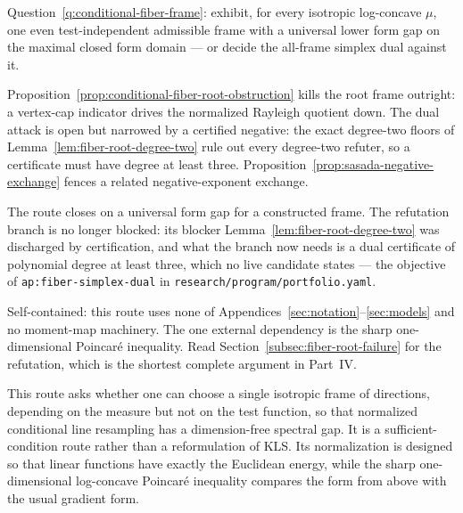 \documentclass[../../main.tex]{subfiles}
\begin{document}
\begin{description}[leftmargin=0pt,style=nextline,itemsep=0.3em]
  \item[5. Exact bottleneck.] Question~\ref{q:conditional-fiber-frame}: exhibit, for every
  isotropic log-concave $\mu$, one even test-independent admissible frame with a universal
  lower form gap on the maximal closed form domain --- or decide the all-frame simplex dual
  against it.

  \item[6. Failed variants and obstructions.]
  Proposition~\ref{prop:conditional-fiber-root-obstruction} kills the root frame outright: a
  vertex-cap indicator drives the normalized Rayleigh quotient down. The dual attack is open
  but narrowed by a certified negative: the exact degree-two floors of
  Lemma~\ref{lem:fiber-root-degree-two} rule out every degree-two refuter, so a certificate
  must have degree at least three. Proposition~\ref{prop:sasada-negative-exchange} fences a
  related negative-exponent exchange.

  \item[7. Completion or reopening criterion.] The route closes on a universal form gap for a
  constructed frame. The refutation branch is no longer blocked: its blocker
  Lemma~\ref{lem:fiber-root-degree-two} was discharged by certification, and what the branch
  now needs is a dual certificate of polynomial degree at least three, which no live candidate
  states --- the objective of \texttt{ap:fiber-simplex-dual} in
  \texttt{research/program/portfolio.yaml}.

  \item[8. Technical reading guide.] Self-contained: this route uses none of
  Appendices~\ref{sec:notation}--\ref{sec:models} and no moment-map machinery. The one external
  dependency is the sharp one-dimensional Poincar\'e inequality. Read
  Section~\ref{subsec:fiber-root-failure} for the refutation, which is the shortest complete
  argument in Part~IV.
\end{description}

This route asks whether one can choose a single isotropic frame of directions, depending on the
measure but not on the test function, so that normalized conditional line resampling has a
dimension-free spectral gap. It is a sufficient-condition route rather than a reformulation of
KLS. Its normalization is designed so that linear functions have exactly the Euclidean energy,
while the sharp one-dimensional log-concave Poincar\'e inequality compares the form from above
with the usual gradient form.
\end{document}
